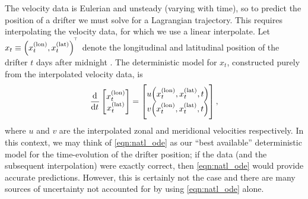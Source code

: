 The velocity data is Eulerian and unsteady (varying with time), so to predict the position of a drifter we must solve for a Lagrangian trajectory.
This requires interpolating the velocity data, for which we use a linear interpolate.
Let \(x_t \equiv \left(x_t^{(\mathrm{lon})}, x_t^{(\mathrm{lat})}\right)^{^{\!\top}}\) denote the longitudinal and latitudinal position of the drifter \(t\) days after midnight .
The deterministic model for \(x_t\), constructed purely from the interpolated velocity data, is
\begin{equation}\label{eqn:natl_ode}
	\dod{}{t}\begin{bmatrix}
		x_t^{(\text{lon})} \\ x_t^{(\text{lat})}
	\end{bmatrix} = \begin{bmatrix}
		u\!\left(x^{(\mathrm{lon})}_t, x^{(\mathrm{lat})}_t, t\right) \\ v\!\left(x^{(\mathrm{lon})}_t, x^{(\mathrm{lat})}_t, t\right)
	\end{bmatrix},
\end{equation}
where \(u\) and \(v\) are the interpolated zonal and meridional velocities respectively.
In this context, we may think of \cref{eqn:natl_ode} as our ``best available'' deterministic model for the time-evolution of the drifter position; if the data (and the subsequent interpolation) were exactly correct, then \cref{eqn:natl_ode} would provide accurate predictions.
However, this is certainly not the case and there are many sources of uncertainty not accounted for by using \cref{eqn:natl_ode} alone.

